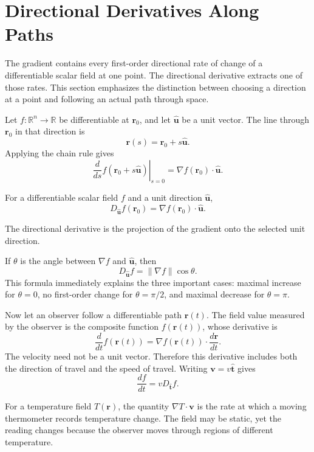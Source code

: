 \section{Directional Derivatives Along Paths}
\label{sec:directional-derivatives}

The gradient contains every first-order directional rate of change of a differentiable scalar field at one point. The directional derivative extracts one of those rates. This section emphasizes the distinction between choosing a direction at a point and following an actual path through space.

Let $f:\mathbb R^n\to\mathbb R$ be differentiable at $\mathbf r_0$, and let $\hat{\mathbf u}$ be a unit vector. The line through $\mathbf r_0$ in that direction is
\[
\mathbf r(s)=\mathbf r_0+s\hat{\mathbf u}.
\]
Applying the chain rule gives
\[
\left.\frac{d}{ds}f(\mathbf r_0+s\hat{\mathbf u})\right|_{s=0}
=\nabla f(\mathbf r_0)\cdot\hat{\mathbf u}.
\]

\begin{bookdefinition}
For a differentiable scalar field $f$ and a unit direction $\hat{\mathbf u}$,
\[
\boxed{D_{\hat{\mathbf u}}f(\mathbf r_0)=\nabla f(\mathbf r_0)\cdot\hat{\mathbf u}.}
\]
\end{bookdefinition}

\begin{bookfigure}{The directional derivative is the projection of the gradient onto the selected unit direction.}
\label{fig:directional-derivative-geometry}

\end{bookfigure}

If $\theta$ is the angle between $\nabla f$ and $\hat{\mathbf u}$, then
\[
D_{\hat{\mathbf u}}f=\lVert\nabla f\rVert\cos\theta.
\]
This formula immediately explains the three important cases: maximal increase for $\theta=0$, no first-order change for $\theta=\pi/2$, and maximal decrease for $\theta=\pi$.

Now let an observer follow a differentiable path $\mathbf r(t)$. The field value measured by the observer is the composite function $f(\mathbf r(t))$, whose derivative is
\[
\boxed{\frac{d}{dt}f(\mathbf r(t))=\nabla f(\mathbf r(t))\cdot\frac{d\mathbf r}{dt}.}
\]
The velocity need not be a unit vector. Therefore this derivative includes both the direction of travel and the speed of travel. Writing $\mathbf v=v\hat{\mathbf t}$ gives
\[
\frac{df}{dt}=vD_{\hat{\mathbf t}}f.
\]

\begin{bookinsight}
For a temperature field $T(\mathbf r)$, the quantity $\nabla T\cdot\mathbf v$ is the rate at which a moving thermometer records temperature change. The field may be static, yet the reading changes because the observer moves through regions of different temperature.
\end{bookinsight}

